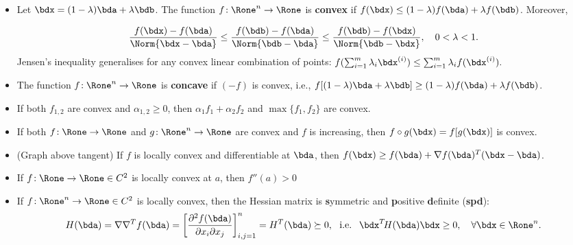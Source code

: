 \documentclass[a4paper]{article}
\begin{document}
\begin{itemize}
  \item Let $\bdx=(1-\lambda)\bda+\lambda\bdb$.
    The function
    $f\!:\Rone^n\to\Rone$ is \textbf{convex} if
    $
    f(\bdx)
    \le
    (1-\lambda) f(\bda)+\lambda f(\bdb)
    $.
    Moreover,

    \[
      \frac{f(\bdx)-f(\bda)}{\Norm{\bdx-\bda}}
      \le
      \frac{f(\bdb)-f(\bda)}{\Norm{\bdb-\bda}}
      \le
      \frac{f(\bdb)-f(\bdx)}{\Norm{\bdb-\bdx}},
      \quad 0 < \lambda < 1.
    \]
  Jensen's inequality generalises for any convex linear combination of points:
    $
    f(\sum_{i=1}^m\lambda_i\bdx^{(i)})
    \le
    \sum_{i=1}^m\lambda_i f(\bdx^{(i)}).
    $

   \item The function $f\!:\Rone^n\to\Rone$ is \textbf{concave} if $(-f)$ is convex, i.e.,
    $
    f[(1-\lambda)\bda+\lambda\bdb]
    \ge
    (1-\lambda) f(\bda)+\lambda f(\bdb)
    $.

  \item If both $f_{1,2}$ are convex and $\alpha_{1,2}\ge0$, then $\alpha_1f_1+\alpha_2 f_2$
    and $\max\{f_1,f_2\}$ are convex.

  \item If both
    $f\!:\Rone\to\Rone$
    and
    $g\!:\Rone^n\to\Rone$
    are convex and $f$ is increasing, then
    $f\circ g(\bdx)=f[g(\bdx)]$ is convex.

  \item (Graph above tangent) If $f$ is locally convex and differentiable at $\bda$, then
  $f(\bdx)\ge f(\bda)+\nabla f(\bda)^T(\bdx-\bda)$.

  \item If $f\!:\Rone\to\Rone\in C^2$ is locally convex at $a$, then $f''(a)>0$

  \item If $f\!:\Rone^n\to\Rone\in C^2$ is locally convex, then the
    Hessian matrix is \textbf{s}ymmetric and \textbf{p}ositive \textbf{d}efinite (\textbf{spd}):
    \[
      H(\bda)=\nabla\nabla^T f(\bda)
      =
      \left[\frac{\partial^2f(\bda)}{ \partial x_i\partial x_j}\right]_{i,j=1}^n
      =H^T(\bda)\succeq 0,
      ~\text{ i.e. }~
      \bdx^T\!H(\bda)\bdx\ge0,
      \quad \forall\bdx\in\Rone^n.
    \]

\end{itemize}

\end{document}
